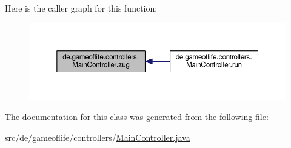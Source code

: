Here is the caller graph for this function\-:\nopagebreak
\begin{figure}[H]
\begin{center}
\leavevmode
\includegraphics[width=350pt]{classde_1_1gameoflife_1_1controllers_1_1MainController_a4be3b9b2a993901333b84ba12223ee3a_icgraph}
\end{center}
\end{figure}




The documentation for this class was generated from the following file\-:\begin{DoxyCompactItemize}
\item 
src/de/gameoflife/controllers/\hyperlink{MainController_8java}{Main\-Controller.\-java}\end{DoxyCompactItemize}

